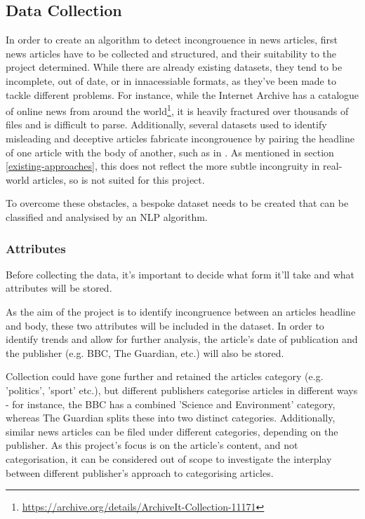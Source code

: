 \subsection{Data Collection}
In order to create an algorithm to detect incongrouence in news articles, first news articles have to be collected and structured, and their suitability to the project determined. While there are already existing datasets, they tend to be incomplete, out of date, or in innacessiable formats, as they've been made to tackle different problems. For instance, while the Internet Archive has a catalogue of online news from around the world\footnote{\url{https://archive.org/details/ArchiveIt-Collection-11171}}, it is heavily fractured over thousands of files and is difficult to parse. Additionally, several datasets used to identify misleading and deceptive articles fabricate incongrouence by pairing the headline of one article with the body of another, such as in . As mentioned in section \ref{existing-approaches}, this does not reflect the more subtle incongruity in real-world articles, so is not suited for this project.

To overcome these obstacles, a bespoke dataset needs to be created that can be classified and analysised by an NLP algorithm.

\subsubsection{Attributes}
Before collecting the data, it's important to decide what form it'll take and what attributes will be stored.

As the aim of the project is to identify incongruence between an articles headline and body, these two attributes will be included in the dataset. In order to identify trends and allow for further analysis, the article's date of publication and the publisher (e.g. BBC, The Guardian, etc.) will also be stored.

Collection could have gone further and retained the articles category (e.g. 'politics', 'sport' etc.), but different publishers categorise articles in different ways - for instance, the BBC has a combined 'Science and Environment' category, whereas The Guardian splits these into two distinct categories. Additionally, similar news articles can be filed under different categories, depending on the publisher. As this project's focus is on the article's content, and not categorisation, it can be considered out of scope to investigate the interplay between different publisher's approach to categorising articles.


